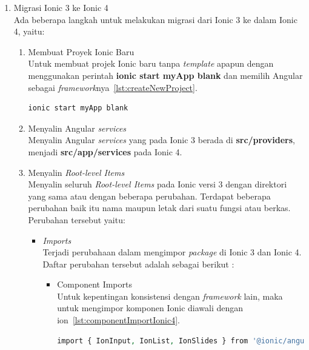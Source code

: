 \begin{enumerate}
	\item Migrasi Ionic 3 ke Ionic 4 \\
	Ada beberapa langkah untuk melakukan migrasi dari Ionic 3 ke dalam Ionic 4, yaitu:
	

	\begin{enumerate}
		\item Membuat Proyek Ionic Baru \\
		Untuk membuat projek Ionic baru tanpa {\it template} apapun dengan menggunakan perintah \textbf{ionic start myApp blank} dan memilih Angular sebagai {\it framework}nya~\ref{lst:createNewProject}.
		\begin{lstlisting}[language=php, label={lst:createNewProject}, caption=Perintah Membuat Proyek Ionic Baru]
			ionic start myApp blank
		\end{lstlisting}

		\item Menyalin Angular {\it services} \\
		Menyalin Angular {\it services} yang pada Ionic 3 berada di \textbf{src/providers}, menjadi \textbf{src/app/services} pada Ionic 4.

		\item Menyalin {\it Root-level Items} \\
		Menyalin seluruh {\it Root-level Items} pada Ionic versi 3 dengan direktori yang sama atau dengan beberapa perubahan. Terdapat beberapa perubahan baik itu nama maupun letak dari suatu fungsi atau berkas. Perubahan tersebut yaitu:

		\begin{itemize}



			\item {\it Imports} \\
			Terjadi perubahaan dalam mengimpor {\it package} di Ionic 3 dan Ionic 4. Daftar perubahan tersebut adalah sebagai berikut :
			\begin{itemize}	
				\item Component Imports \\
				Untuk kepentingan konsistensi dengan {\it framework} lain, maka untuk mengimpor komponen Ionic diawali dengan ion~\ref{lst:componentImportIonic4}.
				\begin{lstlisting}[language=php, label={lst:componentImportIonic4}, caption=Impor Komponen pada Ionic 4]
					import { IonInput, IonList, IonSlides } from '@ionic/angular';
				\end{lstlisting}


\end{itemize}
\end{itemize}
\end{enumerate}
\end{enumerate}
